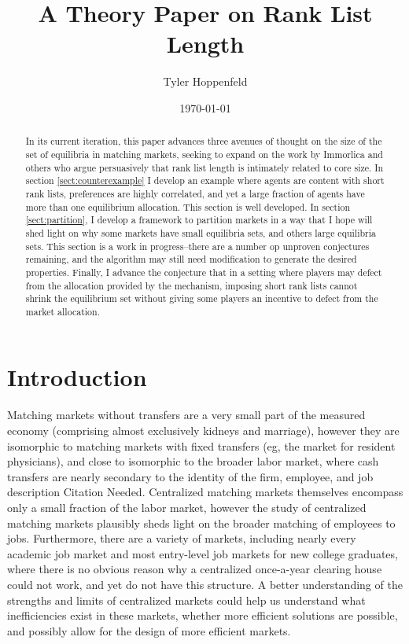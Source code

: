 \documentclass[WP]{AEA}
\begin{document}
\title{A Theory Paper on Rank List Length}
\author{Tyler Hoppenfeld}
\date{\today}
\JEL{}
\Keywords{}

\begin{abstract}
	In its current iteration, this paper advances three avenues of thought on the size of the set of equilibria in matching markets, seeking to expand on the work by Immorlica and others who argue persuasively that rank list length is intimately related to core size. In section
	 \ref{sect:counterexample}
	 I develop an example where agents are content with short rank lists, preferences are highly correlated, and yet a large fraction of agents have more than one equilibrium allocation.  This section is well developed.  In section
	  \ref{sect:partition},
	  I develop a framework to partition markets in a way that I hope will shed light on why some markets have small equilibria sets, and others large equilibria sets. This section is a work in progress--there are a number op unproven conjectures remaining, and the algorithm may still need modification to generate the desired properties. Finally, I advance the conjecture that in a setting where players may defect from the allocation provided by the mechanism, imposing short rank lists cannot shrink the equilibrium set without giving some players an incentive to defect from the market allocation.
\end{abstract}


\maketitle


\section{Introduction}

Matching markets without transfers are a very small part of the measured economy (comprising almost exclusively kidneys and marriage), however they are isomorphic to matching markets with fixed transfers (eg, the market for resident physicians), and close to isomorphic to the broader labor market, where cash transfers are nearly secondary to the identity of the firm, employee, and job description {Citation Needed}.  Centralized matching markets themselves encompass only a small fraction of the labor market, however the study of centralized matching markets plausibly sheds light on the broader matching of employees to jobs. Furthermore, there are a variety of markets, including nearly every academic job market and most entry-level job markets for new college graduates, where there is no obvious reason why a centralized once-a-year clearing house could not work, and yet do not have this structure. A better understanding of the strengths and limits of centralized markets could help us understand what inefficiencies exist in these markets, whether more efficient solutions are possible, and possibly allow for the design of more efficient markets. 
\end{document}
